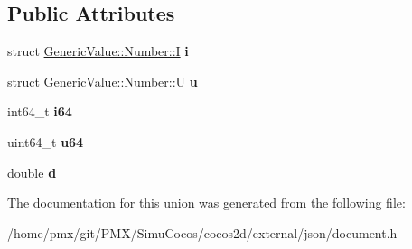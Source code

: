 \subsection*{Public Attributes}
\begin{DoxyCompactItemize}
\item 
\mbox{\label{unionGenericValue_1_1Number_a0593fffc72a240979606668179e94436}} 
struct \hyperlink{structGenericValue_1_1Number_1_1I}{Generic\+Value\+::\+Number\+::I} {\bfseries i}
\item 
\mbox{\label{unionGenericValue_1_1Number_a3b5f0986718c830b88d641491248131d}} 
struct \hyperlink{structGenericValue_1_1Number_1_1U}{Generic\+Value\+::\+Number\+::U} {\bfseries u}
\item 
\mbox{\label{unionGenericValue_1_1Number_ae53d96a8ead92099541da3b71633b77b}} 
int64\+\_\+t {\bfseries i64}
\item 
\mbox{\label{unionGenericValue_1_1Number_a1c8d3c6d226cf74315e233b30b622430}} 
uint64\+\_\+t {\bfseries u64}
\item 
\mbox{\label{unionGenericValue_1_1Number_a7ca3ad492fff303586d241eb0d17c242}} 
double {\bfseries d}
\end{DoxyCompactItemize}


The documentation for this union was generated from the following file\+:\begin{DoxyCompactItemize}
\item 
/home/pmx/git/\+P\+M\+X/\+Simu\+Cocos/cocos2d/external/json/document.\+h\end{DoxyCompactItemize}
